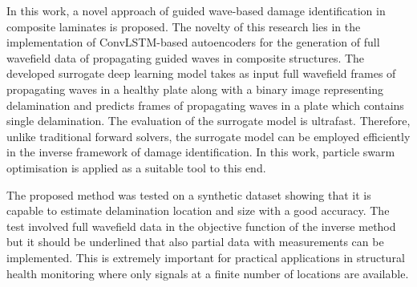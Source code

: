 In this work, a novel approach of guided wave-based damage identification in composite laminates is proposed. 
The novelty of this research lies in the implementation of ConvLSTM-based autoencoders for the generation of full wavefield data of propagating guided waves in composite structures.
The developed surrogate deep learning model takes as input full wavefield frames of propagating waves in a healthy plate along with a binary image representing delamination and predicts frames of propagating waves in a plate which contains single delamination.
The evaluation of the surrogate model is ultrafast.
Therefore, unlike traditional forward solvers, the surrogate model can be employed efficiently in the inverse framework of damage identification.
In this work, particle swarm optimisation is applied as a suitable tool to this 
end. 


The proposed method was tested on a synthetic dataset showing that it is 
capable to estimate delamination location and size with a good accuracy.
The test involved full wavefield data in the objective function of the inverse 
method but it should be underlined that also partial data with measurements can 
be implemented.
This is extremely important for practical applications in structural health 
monitoring where only signals at a finite number of locations are available.
